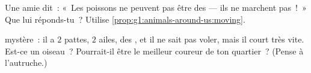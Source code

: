 \begin{exercise}[$\star\star$]\label{exo:g1:animals-around-us:9}
Une amie dit~: «~Les poissons ne peuvent pas être des  ---
ils ne marchent pas~!~» Que lui réponds-tu~? Utilise
\cref{prop:g1:animals-around-us:moving}.
\end{exercise}

\begin{exercise}[$\star\star$]\label{exo:g1:animals-around-us:10}
 mystère~: il a $2$ pattes, $2$ ailes, des , et il ne
sait pas voler, mais il court très vite. Est-ce un oiseau~?
Pourrait-il être le meilleur coureur de ton quartier~? (Pense à
l'autruche.)
\end{exercise}
